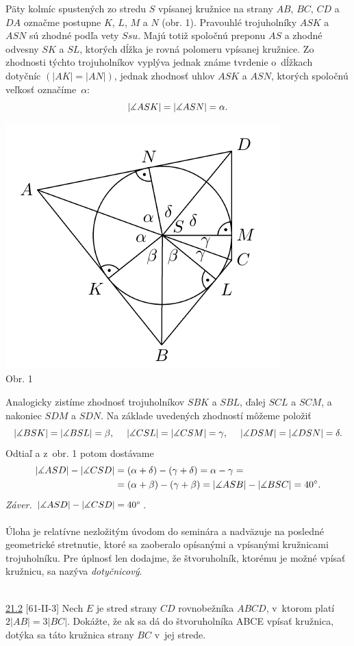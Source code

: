 \rieh Päty kolmíc spustených zo stredu $S$ vpísanej kružnice na strany $AB$, $BC$, $CD$ a $DA$ označme postupne $K$, $L$, $M$ a $N$ (obr. 1). Pravouhlé trojuholníky $ASK$ a $ASN$ sú zhodné podľa vety $Ssu$. Majú totiž spoločnú preponu $AS$ a zhodné odvesny $SK$ a $SL$, ktorých dĺžka je rovná polomeru vpísanej kružnice. Zo zhodnosti týchto trojuholníkov vyplýva jednak známe tvrdenie o~dĺžkach dotyčníc $(|AK| = |AN|)$, jednak zhodnosť uhlov $ASK$ a $ASN$, ktorých spoločnú veľkosť označíme~$\alpha$:$$|\measuredangle ASK| = |\measuredangle ASN| = \alpha.$$
\begin{center}
\includegraphics{obrazky/57D2}\\

Obr. 1
\end{center}
Analogicky zistíme zhodnosť trojuholníkov $SBK$ a $SBL$, ďalej $SCL$ a $SCM$, a nakoniec $SDM$ a $SDN$. Na základe uvedených zhodností môžeme položiť
$$|\measuredangle BSK| = |\measuredangle BSL| = \beta, \ \ \ \  |\measuredangle CSL| = |\measuredangle CSM| = \gamma, \ \ \ \  |\measuredangle DSM| = |\measuredangle DSN| = \delta.$$
Odtiaľ a z~obr. 1 potom dostávame
\begin{align*}
|\measuredangle ASD| - |\measuredangle CSD| &= (\alpha + \delta)- (\gamma + \delta) = \alpha - \gamma =\\
&= (\alpha + \beta) - (\gamma + \beta) = |\measuredangle ASB| - |\measuredangle BSC| = 40^\circ.
\end{align*}
\textit{Záver.} $|\measuredangle ASD|  -|\measuredangle CSD| = 40^\circ$.\\
\\
\kom Úloha je relatívne nezložitým úvodom do seminára a nadväzuje na posledné geometrické stretnutie, ktoré sa zaoberalo opísanými a vpísanými kružnicami trojuholníku. Pre úplnosť len dodajme, že štvoruholník, ktorému je možné vpísať kružnicu, sa nazýva \textit{dotyčnicový}.\\
\\
\begin{tcolorbox}[breakable,notitle,boxrule=0pt,colback=light-gray,colframe=light-gray]\ul{21.2} [61-II-3] Nech $E$ je stred strany $CD$ rovnobežníka $ABCD$, v~ktorom platí $2|AB| = 3|BC|$. Dokážte, že ak sa dá do štvoruholníka ABCE vpísať kružnica, dotýka sa táto kružnica strany $BC$ v~jej strede.

\end{tcolorbox}

